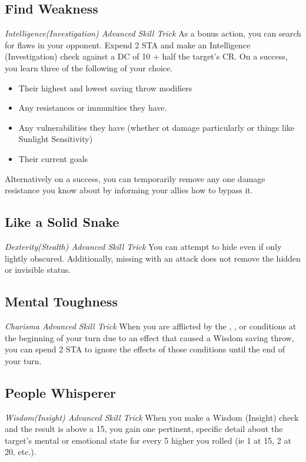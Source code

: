 \subsection{Find Weakness}
\textit{Intelligence(Investigation) Advanced Skill Trick}
As a bonus action, you can search for flaws in your opponent. Expend 2 STA and make an Intelligence (Investigation) check against a DC of 10 + half the target's CR. On a success, you learn three of the following of your choice.
\begin{itemize}
	\item Their highest and lowest saving throw modifiers
	\item Any resistances or immunities they have.
	\item Any vulnerabilities they have (whether ot damage particularly or things like Sunlight Sensitivity)
	\item Their current goals
\end{itemize}

Alternatively on a success, you can temporarily remove any one damage resistance you know about by informing your allies how to bypass it.

\subsection{Like a Solid Snake}
\textit{Dexterity(Stealth) Advanced Skill Trick}
You can attempt to hide even if only lightly obscured. Additionally, missing with an attack does not remove the hidden or invisible status.

\subsection{Mental Toughness}
\textit{Charisma Advanced Skill Trick}
When you are afflicted by the , , or  conditions at the beginning of your turn due to an effect that caused a Wisdom saving throw, you can spend 2 STA to ignore the effects of those conditions until the end of your turn.

\subsection{People Whisperer}
\textit{Wisdom(Insight) Advanced Skill Trick}
When you make a Wisdom (Insight) check and the result is above a 15, you gain one pertinent, specific detail about the target's mental or emotional state for every 5 higher you rolled (ie 1 at 15, 2 at 20, etc.).

